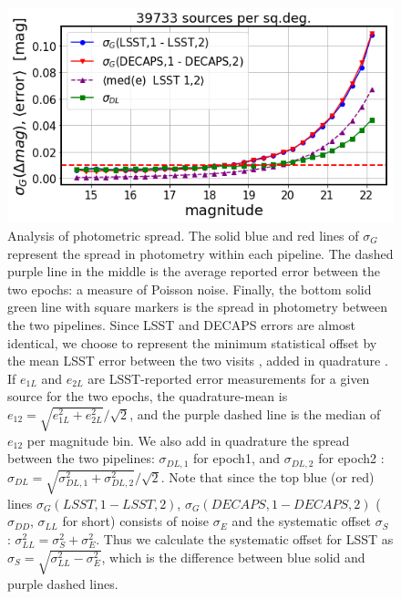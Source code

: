 \documentclass[DM,lsstdraft,toc,usenatbib]{lsstdoc}
\begin{document}
\begin{figure}
\begin{centering}
\includegraphics[width=0.8\columnwidth]{figs/photometric_spread_2_525846-530012.png}
\caption{Analysis of  photometric spread. The solid blue and red lines of $\sigma_{G}$  represent the spread in photometry within each pipeline. The dashed purple line in the middle is the average reported error between the two epochs: a measure of Poisson noise. Finally, the bottom solid green line with square markers is the spread in photometry between the two pipelines.  Since LSST and DECAPS errors are almost identical, we choose to represent the minimum statistical offset by the mean LSST error between the two visits , added in quadrature . If $e_{1L}$ and $e_{2L}$ are LSST-reported error measurements for a given source for the two epochs,  the quadrature-mean is  $e_{12} = \sqrt{e_{1L}^{2} + e_{2L}^{2}} / \sqrt{2}$, and the purple dashed line is the median of $e_{12}$ per magnitude bin. We also add in quadrature the spread between the two pipelines: $\sigma_{DL,1}$ for epoch1, and $\sigma_{DL,2}$ for epoch2 : $\sigma_{DL} = \sqrt{\sigma_{DL,1}^{2} + \sigma_{DL,2}^{2}} / \sqrt{2}$.  Note that since the top blue (or red) lines $\sigma_{G}(LSST,1 - LSST,2)$, $\sigma_{G}(DECAPS,1 - DECAPS,2)$   ($\sigma_{DD}$, $\sigma_{LL}$ for short) consists of noise $\sigma_{E} $ and the systematic offset $\sigma_{S}$ : $\sigma_{LL}^{2} = \sigma_{S}^{2} + \sigma_{E}^{2}$. Thus we calculate the systematic offset for LSST as  $\sigma_{S} = \sqrt{\sigma_{LL}^2  - \sigma_{E}^{2}}$, which is the difference between  blue solid and purple dashed lines. 
}
\label{fig:spread}
\end{centering}
\end{figure} 
\end{document}

